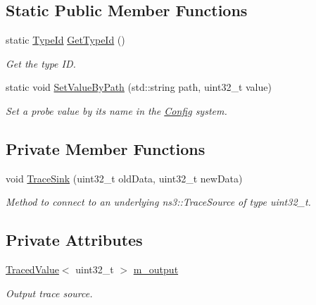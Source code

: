 \subsection*{Static Public Member Functions}
\begin{DoxyCompactItemize}
\item 
static \hyperlink{classns3_1_1TypeId}{Type\+Id} \hyperlink{classns3_1_1Uinteger32Probe_a7a5db553d7f0881f9d05574e144a0823}{Get\+Type\+Id} ()
\begin{DoxyCompactList}\small\item\em Get the type ID. \end{DoxyCompactList}\item 
static void \hyperlink{classns3_1_1Uinteger32Probe_a03d73911d61ac49c08940c53447a5463}{Set\+Value\+By\+Path} (std\+::string path, uint32\+\_\+t value)
\begin{DoxyCompactList}\small\item\em Set a probe value by its name in the \hyperlink{namespacens3_1_1Config}{Config} system. \end{DoxyCompactList}\end{DoxyCompactItemize}
\subsection*{Private Member Functions}
\begin{DoxyCompactItemize}
\item 
void \hyperlink{classns3_1_1Uinteger32Probe_a8cc7f06e38d23dea37e2f2045a5d43a1}{Trace\+Sink} (uint32\+\_\+t old\+Data, uint32\+\_\+t new\+Data)
\begin{DoxyCompactList}\small\item\em Method to connect to an underlying ns3\+::\+Trace\+Source of type uint32\+\_\+t. \end{DoxyCompactList}\end{DoxyCompactItemize}
\subsection*{Private Attributes}
\begin{DoxyCompactItemize}
\item 
\hyperlink{classns3_1_1TracedValue}{Traced\+Value}$<$ uint32\+\_\+t $>$ \hyperlink{classns3_1_1Uinteger32Probe_adf56bc1493ebe89ff79c9b51e50989e0}{m\+\_\+output}
\begin{DoxyCompactList}\small\item\em Output trace source. \end{DoxyCompactList}\end{DoxyCompactItemize}
